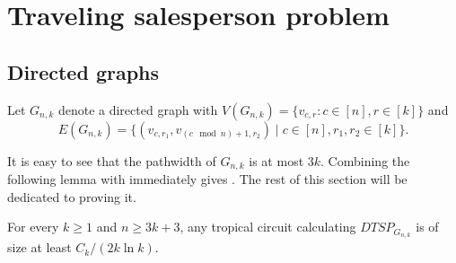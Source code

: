 \section{Traveling salesperson problem}
\label{sec:tsp}

\subsection{Directed graphs}

Let $G_{n, k}$ denote a directed graph with
$
V(G_{n, k}) = \{ v_{c, r} \colon c \in [n], r \in [k] \}
$
and
$$
E(G_{n, k}) = \{ (v_{c, r_1}, v_{(c \mod n) + 1, r_2}) \mid c \in [n], r_1, r_2 \in [k] \}.
$$


It is easy to see that the pathwidth of $G_{n, k}$ is at most $3k$.
Combining the following lemma with  immediately gives . The rest of this section will be dedicated to proving it.

\begin{lemma}\label{lem:main_dtsp}
    For every $k \geq 1$ and $n \geq 3k + 3$, any tropical circuit calculating $DTSP_{G_{n, k}}$ is of size at least $C_k / (2k \ln k)$.
\end{lemma}


